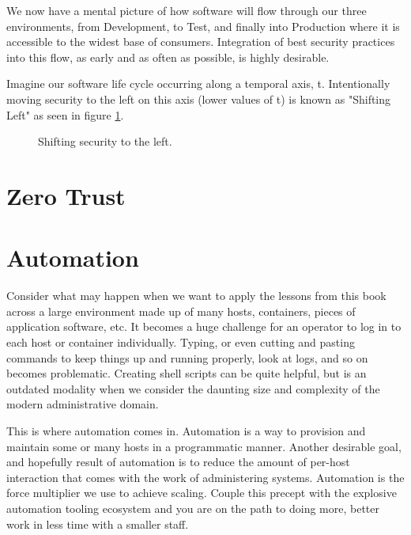 \justify
We now have a mental picture of how software will flow through our
three environments, from Development, to Test, and finally into Production
where it is accessible to the widest base of consumers. Integration of 
best security practices into this flow, as early and as often as possible, 
is highly desirable. 

\justify
Imagine our software life cycle occurring along a temporal 
axis, t. Intentionally moving security to the left on this axis (lower 
values of t) is known as "Shifting Left" as seen in 
figure \ref{fig:shift}.

\justify
\begin{figure}[!htb]
	\centering
	\caption{Shifting security to the left.}
	\label{fig:shift}
\end{figure}

\justify


\section{Zero Trust}

\section{Automation}

\justify
Consider what may happen when we want to apply the lessons from this book across a large environment made up of many hosts, containers, pieces of application software, etc. It becomes a huge challenge for an operator to log in to each host or container individually. Typing, or even cutting and pasting commands to keep things up and running properly, look at logs, and so on becomes problematic. Creating shell scripts can be quite helpful, but is an outdated modality when we consider the daunting size and complexity of the modern administrative domain.

\justify
This is where automation comes in. Automation is a way to provision and maintain some or many hosts in a programmatic manner. Another desirable goal, and hopefully result of automation is to reduce the amount of per-host interaction that comes with the work of administering systems. Automation is the force multiplier we use to achieve scaling. Couple this precept with the explosive automation tooling ecosystem and you are on the path to doing more, better work in less time with a smaller staff. 


